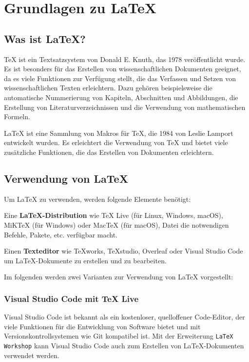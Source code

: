 \section{Grundlagen zu \LaTeX{}}
\label{sec:grundlagen}

\subsection{Was ist \LaTeX{}?}
\label{sec:was_ist_latex}

\TeX{} ist ein Textsatzsystem von Donald E. Knuth, das 1978 veröffentlicht wurde. Es ist besonders für das Erstellen von wissenschaftlichen Dokumenten geeignet, da es viele Funktionen zur Verfügung stellt, die das Verfassen und Setzen von wissenschaftlichen Texten erleichtern. Dazu gehören beispielsweise die automatische Nummerierung von Kapiteln, Abschnitten und Abbildungen, die Erstellung von Literaturverzeichnissen und die Verwendung von mathematischen Formeln.

\LaTeX{} ist eine Sammlung von Makros für \TeX{}, die 1984 von Leslie Lamport entwickelt wurden. Es erleichtert die Verwendung von \TeX{} und bietet viele zusätzliche Funktionen, die das Erstellen von Dokumenten erleichtern.


\subsection{Verwendung von \LaTeX{}}
\label{sec:verwendung_von_latex}
Um \LaTeX{} zu verwenden, werden folgende Elemente benötigt:

Eine \textbf{\LaTeX{}-Distribution} wie TeX Live (für Linux, Windows, macOS), MiKTeX (für Windows) oder MacTeX (für macOS), Datei die notwendigen Befehle, Pakete, etc. verfügbar macht.

Einen \textbf{Texteditor} wie TeXworks, TeXstudio, Overleaf oder Visual Studio Code um \LaTeX{}-Dokumente zu erstellen und zu bearbeiten.

Im folgenden werden zwei Varianten zur Verwendung von \LaTeX{} vorgestellt:

\subsubsection{Visual Studio Code mit TeX Live}
\label{sec:visual_studio_code_mit_tex_live}
Visual Studio Code ist bekannt als ein kostenloser, quelloffener Code-Editor, der viele Funktionen für die Entwicklung von Software bietet und mit Versionskontrollsystemen wie Git kompatibel ist. Mit der Erweiterung \texttt{LaTeX Workshop} kann Visual Studio Code auch zum Erstellen von \LaTeX{}-Dokumenten verwendet werden.


